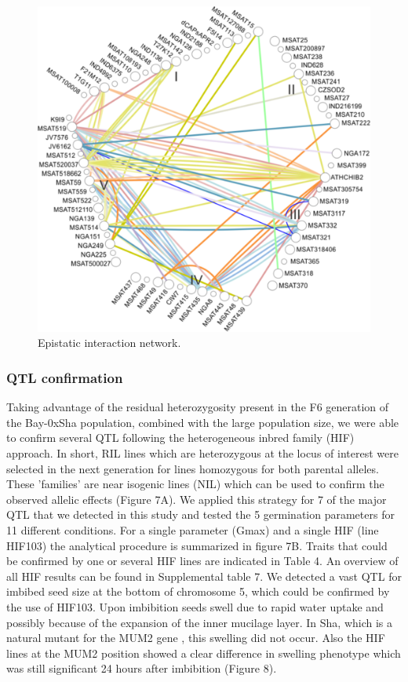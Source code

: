 \begin{figure}[h!]
  \centering
  \includegraphics[keepaspectratio,scale=0.30]{eps/image_3_1_6.eps}
  \caption[Epistatic interaction network.]
    {Epistatic interaction network.}
\end{figure}

\subsubsection{QTL confirmation}
Taking advantage of the residual heterozygosity present in the F6 generation of the Bay-0xSha population, 
combined with the large population size, we were able to confirm several QTL following the heterogeneous 
inbred family (HIF) approach. In short, RIL lines which are heterozygous at the locus of interest were 
selected in the next generation for lines homozygous for both parental alleles. These 'families' are 
near isogenic lines (NIL) which can be used to confirm the observed allelic effects (Figure 7A). We 
applied this strategy for 7 of the major QTL that we detected in  this study and tested the 5 germination 
parameters for 11 different conditions. For a single parameter (Gmax) and a single HIF (line HIF103) the 
analytical procedure is summarized in figure 7B. Traits that could be confirmed by one or several HIF 
lines are indicated in Table 4. An overview of all HIF results can be found in Supplemental table 7. We 
detected a vast QTL for imbibed seed size at the bottom of chromosome 5, which could be confirmed by the 
use of HIF103. Upon imbibition seeds swell due to rapid water uptake and possibly because of the 
expansion of the inner mucilage layer. In Sha, which is a natural mutant for the MUM2 gene 
\cite{Macquet:2007}, this swelling did not occur. Also the HIF lines at the MUM2 position showed a 
clear difference in swelling phenotype which was still significant 24 hours after imbibition (Figure 8).

